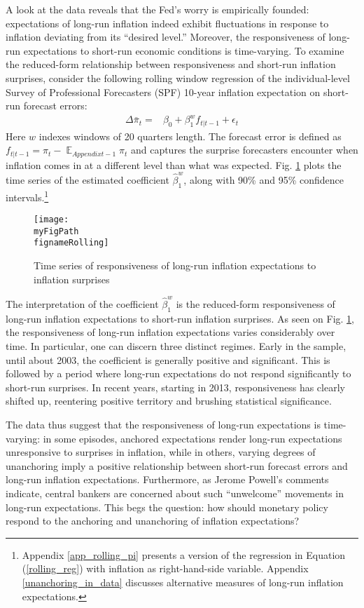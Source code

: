 \documentclass[11pt]{article}
\def \myFigPath {../../figures/}
\renewcommand{\[}{\begin{equation}}
\renewcommand{\]}{\end{equation}}
\DeclareMathOperator{\E}{\mathbb{E}}
\def\fignameRolling{rolling_overlapping_command_anchoring_in_data_individual_23_Sep_2020_21_04_48}
\begin{document}
A look at the data reveals that the Fed's worry is empirically founded: expectations of long-run inflation indeed exhibit fluctuations in response to inflation deviating from its ``desired level.'' Moreover, the responsiveness of long-run expectations to short-run economic conditions is time-varying. To examine the reduced-form relationship between responsiveness and short-run inflation surprises, consider the following rolling window regression of the individual-level Survey of Professional Forecasters (SPF) 10-year inflation expectation on short-run forecast errors:
\begin{align}
\Delta\bar{\pi}_t = & \beta_0 + \beta^w_1 f_{t|t-1} + \epsilon_t 
\label{rolling_reg}
\end{align}
Here $w$ indexes windows of 20 quarters length. The forecast error is defined as $f_{t|t-1} = \pi_t - \E_{Appendixt-1}\pi_t$ and captures the surprise forecasters encounter when inflation comes in at a different level than what was expected. Fig. \ref{rolling} plots the time series of the estimated coefficient $\hat{\beta}^w_1$, along with 90\% and 95\% confidence intervals.\footnote{Appendix \ref{app_rolling_pi} presents a version of the regression in Equation (\ref{rolling_reg}) with inflation as right-hand-side variable. Appendix \ref{unanchoring_in_data} discusses alternative measures of long-run inflation expectations.}


\begin{figure}[h!]
\texttt{[image: \\myFigPath \\fignameRolling]}
\caption{Time series of responsiveness of long-run inflation expectations to inflation surprises}
\label{rolling}
\end{figure}

The interpretation of the coefficient $\hat{\beta}^w_1$ is the reduced-form responsiveness of long-run inflation expectations to short-run inflation surprises. As seen on Fig. \ref{rolling}, the responsiveness of long-run inflation expectations varies considerably over time. In particular, one can discern three distinct regimes. Early in the sample, until about 2003, the coefficient is generally positive and significant. This is followed by a period where long-run expectations do not respond significantly to short-run surprises. In recent years, starting in 2013, responsiveness has clearly shifted up, reentering positive territory and brushing statistical significance. 

The data thus suggest that the responsiveness of long-run expectations is time-varying: in some episodes, anchored expectations render long-run expectations unresponsive to surprises in inflation, while in others, varying degrees of unanchoring imply a positive relationship between short-run forecast errors and long-run inflation expectations. Furthermore, as Jerome Powell's comments indicate, central bankers are concerned about such ``unwelcome'' movements in long-run expectations. This begs the question: how should monetary policy respond to the anchoring and unanchoring of inflation expectations?
\end{document}
